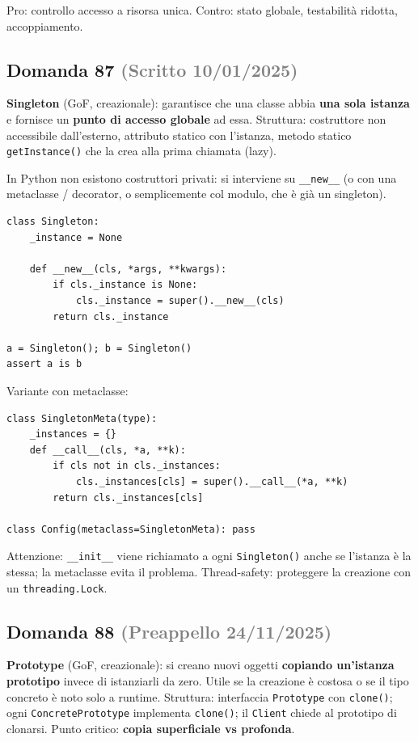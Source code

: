 \documentclass[a4paper,11pt]{article}
\begin{document}
Pro: controllo accesso a risorsa unica. Contro: stato globale, testabilità ridotta, accoppiamento.



\subsection*{Domanda 87 \hfill {\small \textcolor{gray}{(Scritto 10/01/2025)}}}
\textbf{Singleton} (GoF, creazionale): garantisce che una classe abbia \textbf{una sola istanza} e fornisce un \textbf{punto di accesso globale} ad essa. Struttura: costruttore non accessibile dall'esterno, attributo statico con l'istanza, metodo statico \texttt{getInstance()} che la crea alla prima chiamata (lazy).

In Python non esistono costruttori privati: si interviene su \texttt{\_\_new\_\_} (o con una metaclasse / decorator, o semplicemente col modulo, che è già un singleton).

\begin{verbatim}
class Singleton:
    _instance = None

    def __new__(cls, *args, **kwargs):
        if cls._instance is None:
            cls._instance = super().__new__(cls)
        return cls._instance

a = Singleton(); b = Singleton()
assert a is b
\end{verbatim}
Variante con metaclasse:

\begin{verbatim}
class SingletonMeta(type):
    _instances = {}
    def __call__(cls, *a, **k):
        if cls not in cls._instances:
            cls._instances[cls] = super().__call__(*a, **k)
        return cls._instances[cls]

class Config(metaclass=SingletonMeta): pass
\end{verbatim}
Attenzione: \texttt{\_\_init\_\_} viene richiamato a ogni \texttt{Singleton()} anche se l'istanza è la stessa; la metaclasse evita il problema. Thread-safety: proteggere la creazione con un \texttt{threading.Lock}.



\subsection*{Domanda 88 \hfill {\small \textcolor{gray}{(Preappello 24/11/2025)}}}
\textbf{Prototype} (GoF, creazionale): si creano nuovi oggetti \textbf{copiando un'istanza prototipo} invece di istanziarli da zero. Utile se la creazione è costosa o se il tipo concreto è noto solo a runtime. Struttura: interfaccia \texttt{Prototype} con \texttt{clone()}; ogni \texttt{ConcretePrototype} implementa \texttt{clone()}; il \texttt{Client} chiede al prototipo di clonarsi. Punto critico: \textbf{copia superficiale vs profonda}.
\end{document}
